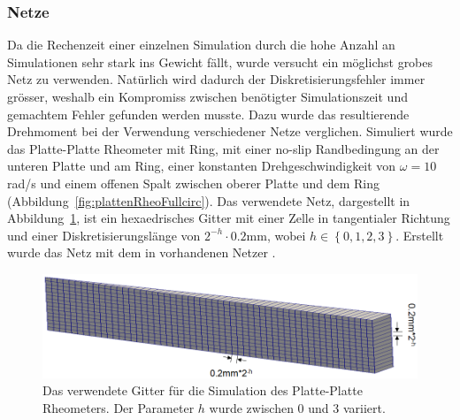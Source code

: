 \subsubsection{Netze}
Da die Rechenzeit einer einzelnen Simulation durch die hohe Anzahl an Simulationen sehr stark ins Gewicht fällt, wurde versucht ein möglichst grobes Netz zu verwenden. Natürlich wird dadurch der Diskretisierungsfehler immer grösser, weshalb ein Kompromiss zwischen benötigter Simulationszeit und gemachtem Fehler gefunden werden musste.
Dazu wurde das resultierende Drehmoment bei der Verwendung verschiedener Netze verglichen. Simuliert wurde das Platte-Platte Rheometer mit Ring, mit einer \glqq{}no-slip\grqq{} Randbedingung an der unteren Platte und am Ring, einer konstanten Drehgeschwindigkeit von $\omega=10$ rad/s und einem offenen Spalt zwischen oberer Platte und dem Ring (Abbildung~\ref{fig:plattenRheoFullcirc}). 
Das verwendete Netz, dargestellt in Abbildung~\ref{fig:PlatteRheoGitter}, ist ein hexaedrisches Gitter mit einer Zelle in tangentialer Richtung und einer Diskretisierungslänge von $2^{-h} \cdot 0.2\mbox{mm}$, wobei $h\in\left\{ 0,1,2,3 \right\}$. Erstellt wurde das Netz mit dem in \openfoam{} vorhandenen Netzer .
%
\begin{figure}[tb]
    \centering
    \includegraphics[width=\textwidth]{figures/PlatteRheoGitterAnnot.png}
    \caption{Das verwendete Gitter für die Simulation des Platte-Platte Rheometers. Der Parameter $h$ wurde zwischen 0 und 3 variiert.}
    \label{fig:PlatteRheoGitter}
\end{figure}
%

